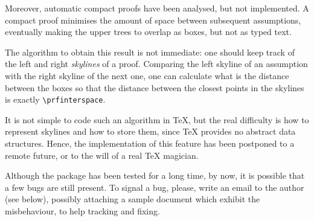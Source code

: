 \documentclass{amsart}
\begin{document}
Moreover, automatic compact proofs have been analysed, but not
implemented. A compact proof minimises the amount of space between
subsequent assumptions, eventually making the upper trees to overlap
as boxes, but not as typed text. 

The algorithm to obtain this result is not immediate: one should keep
track of the left and right \emph{skylines} of a proof. Comparing the
left skyline of an assumption with the right skyline of the next one,
one can calculate what is the distance between the boxes so that the
distance between the closest points in the skylines is exactly
\verb|\prfinterspace|. 

It is not simple to code such an algorithm in \TeX{}, but the real
difficulty is how to represent skylines and how to store them, since
\TeX{} provides no abstract data structures. Hence, the implementation
of this feature has been postponed to a remote future, or to the will
of a real \TeX{} magician.
\vfill

Although the package has been tested for a long time, by now, it is
possible that a few bugs are still present. To signal a bug, please,
write an email to the author (see below), possibly attaching a sample
document which exhibit the misbehaviour, to help tracking and fixing.
\vfill
\end{document}
